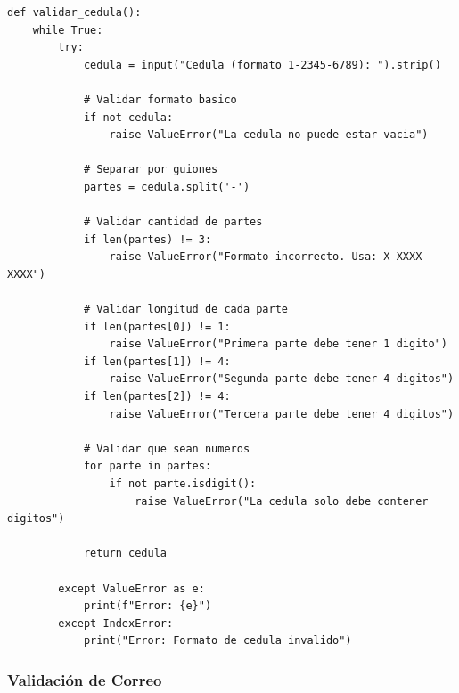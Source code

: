 \documentclass[12pt,a4paper]{article}
\begin{document}
\begin{lstlisting}[caption=Validación de cedula]
def validar_cedula():
    while True:
        try:
            cedula = input("Cedula (formato 1-2345-6789): ").strip()
            
            # Validar formato basico
            if not cedula:
                raise ValueError("La cedula no puede estar vacia")
            
            # Separar por guiones
            partes = cedula.split('-')
            
            # Validar cantidad de partes
            if len(partes) != 3:
                raise ValueError("Formato incorrecto. Usa: X-XXXX-XXXX")
            
            # Validar longitud de cada parte
            if len(partes[0]) != 1:
                raise ValueError("Primera parte debe tener 1 digito")
            if len(partes[1]) != 4:
                raise ValueError("Segunda parte debe tener 4 digitos")
            if len(partes[2]) != 4:
                raise ValueError("Tercera parte debe tener 4 digitos")
            
            # Validar que sean numeros
            for parte in partes:
                if not parte.isdigit():
                    raise ValueError("La cedula solo debe contener digitos")
            
            return cedula
            
        except ValueError as e:
            print(f"Error: {e}")
        except IndexError:
            print("Error: Formato de cedula invalido")
\end{lstlisting}

\subsubsection{Validación de Correo}
\end{document}
